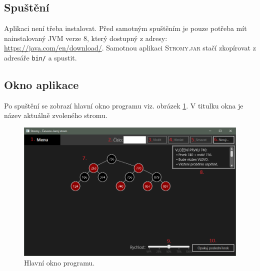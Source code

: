 \documentclass[
  biblatex=false,
  font=serif,
  glossaries=false,
  tables=false,
  theorems=false,
  index
]{kidiplom}
\begin{document}
\subsection{Spuštění}
\indent \indent Aplikaci není třeba instalovat. Před samotným spuštěním je pouze potřeba mít nainstalovaný JVM verze 8, který dostupný z adresy: \url{https://java.com/en/download/}. Samotnou aplikaci \textsc{Stromy.jar} stačí zkopírovat z adresáře \texttt{bin/} a spustit.

\subsection{Okno aplikace}
\indent \indent Po spuštění se zobrazí hlavní okno programu viz. obrázek \ref{hlavniOkno}. V titulku okna je název aktuálně zvoleného stromu.

\begin{figure}[h!]
\centering
	\includegraphics[scale=0.5]{obrazky/34Program.png}
	\caption{Hlavní okno programu.}
	\label{hlavniOkno}
\end{figure}

\newpage
\end{document}
